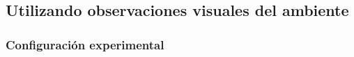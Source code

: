 

\newpage

\subsection{Utilizando observaciones visuales del ambiente}

\subsubsection{Configuración experimental}

